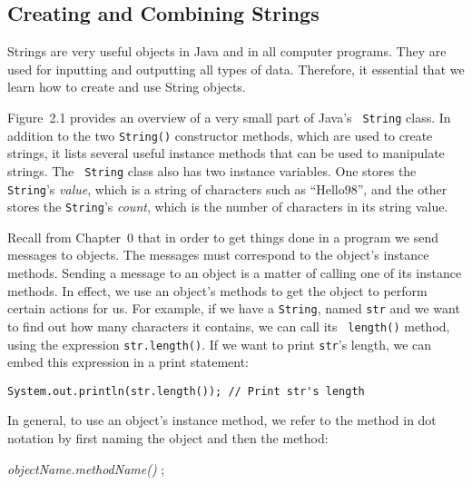 \subsection{Creating and Combining Strings}

Strings are very useful objects in Java and in all computer programs.
They are used for inputting and outputting all types of
data. Therefore, it essential that we learn how to create and use
String objects.

Figure~2.1 provides an overview of a very small part of Java's {\tt
String} class. In addition to the two {\tt String()} constructor
methods, which are used to create strings, it lists several useful
instance methods that can be used to manipulate strings. The {\tt
String} class also has two instance variables. One stores the {\tt
String}'s {\it value}, which is a string of characters such as
``Hello98'', and the other stores the {\tt String}'s {\it count},
which is the number of characters in its string value.

Recall from Chapter~0 that in order to get things done in a program we
send messages to objects. The messages must correspond to the object's
instance methods. Sending a message to an object is a matter of
calling one of its instance methods.  In effect, we use an object's
methods to get the object to perform certain actions for us. For
example, if we have a {\tt String}, named {\tt str} and we want to
find out how many characters it contains, we can call its {\tt
length()} method, using the expression {\tt str.length()}. If we
want to print {\tt str}'s length, we can embed this expression in
a print statement:

\begin{jjjlisting}
\begin{lstlisting}
System.out.println(str.length()); // Print str's length
\end{lstlisting}
\end{jjjlisting}

\noindent In general, to use an object's instance method, we refer 
to the method in dot notation by first naming the object and then the
method:

\begin{extract}
{\it objectName.methodName()} ;
\end{extract}

